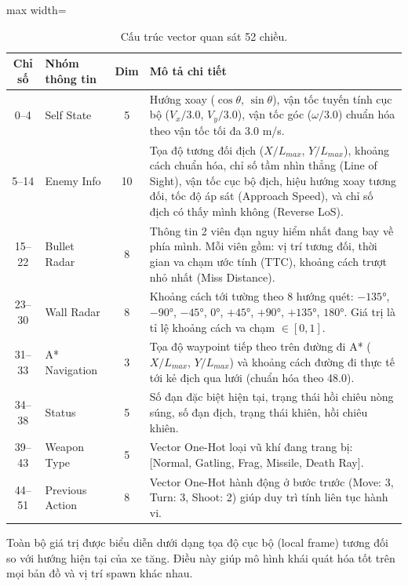 \documentclass[a4paper, 12pt]{report}
\begin{document}
  \begin{table}[H]
  \centering
  \caption{Cấu trúc vector quan sát 52 chiều.}
  \label{tab:obs}
  \small
  \renewcommand{\arraystretch}{1.25}
  \begin{adjustbox}{max width=\textwidth}
  \begin{tabular}{c l c p{9cm}}
    \toprule
    \textbf{Chỉ số} & \textbf{Nhóm thông tin} & \textbf{Dim} & \textbf{Mô tả chi tiết} \\
    \midrule
    0--4   & Self State       & 5  & Hướng xoay ($\cos\theta$, $\sin\theta$), vận tốc tuyến tính cục bộ ($V_x/3.0$, $V_y/3.0$), vận tốc góc ($\omega/3.0$) chuẩn hóa theo vận tốc tối đa 3.0 m/s. \\
    5--14  & Enemy Info       & 10 & Tọa độ tương đối địch ($X/L_{max}$, $Y/L_{max}$), khoảng cách chuẩn hóa, chỉ số tầm nhìn thẳng (Line of Sight), vận tốc cục bộ địch, hiệu hướng xoay tương đối, tốc độ áp sát (Approach Speed), và chỉ số địch có thấy mình không (Reverse LoS). \\
    15--22 & Bullet Radar     & 8  & Thông tin 2 viên đạn nguy hiểm nhất đang bay về phía mình. Mỗi viên gồm: vị trí tương đối, thời gian va chạm ước tính (TTC), khoảng cách trượt nhỏ nhất (Miss Distance). \\
    23--30 & Wall Radar       & 8  & Khoảng cách tới tường theo 8 hướng quét: $-135°$, $-90°$, $-45°$, $0°$, $+45°$, $+90°$, $+135°$, $180°$. Giá trị là tỉ lệ khoảng cách va chạm $\in [0, 1]$. \\
    31--33 & A* Navigation    & 3  & Tọa độ waypoint tiếp theo trên đường đi A* ($X/L_{max}$, $Y/L_{max}$) và khoảng cách đường đi thực tế tới kẻ địch qua lưới (chuẩn hóa theo 48.0). \\
    34--38 & Status           & 5  & Số đạn đặc biệt hiện tại, trạng thái hồi chiêu nòng súng, số đạn địch, trạng thái khiên, hồi chiêu khiên. \\
    39--43 & Weapon Type      & 5  & Vector One-Hot loại vũ khí đang trang bị: [Normal, Gatling, Frag, Missile, Death Ray]. \\
    44--51 & Previous Action  & 8  & Vector One-Hot hành động ở bước trước (Move: 3, Turn: 3, Shoot: 2) giúp duy trì tính liên tục hành vi. \\
    \bottomrule
  \end{tabular}
  \end{adjustbox}
  \end{table}

  Toàn bộ giá trị được biểu diễn dưới dạng tọa độ cục bộ (local frame) tương đối so với hướng hiện tại của xe tăng. Điều này giúp mô hình khái quát hóa tốt trên mọi bản đồ và vị trí spawn khác nhau.
\end{document}
